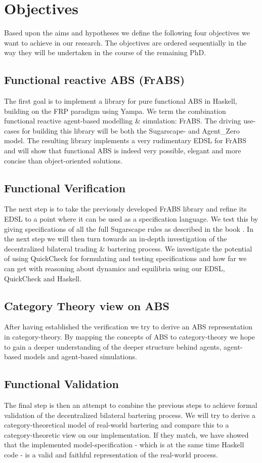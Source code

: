 \section{Objectives}
Based upon the aims and hypotheses we define the following four objectives we want to achieve in our research. The objectives are ordered sequentially in the way they will be undertaken in the course of the remaining PhD.

\subsection{Functional reactive ABS (FrABS)}
The first goal is to implement a library for pure functional ABS in Haskell, building on the FRP paradigm using Yampa. We term the combination functional reactive agent-based modelling \& simulation: FrABS. The driving use-cases for building this library will be both the Sugarscape- and Agent\_Zero model. The resulting library implements a very rudimentary EDSL for FrABS and will show that functional ABS is indeed very possible, elegant and more concise than object-oriented solutions.

\subsection{Functional Verification}
The next step is to take the previously developed FrABS library and refine its EDSL to a point where it can be used as a specification language. We test this by giving specifications of all the full Sugarscape rules as described in the book \cite{epstein_growing_1996}. In the next step we will then turn towards an in-depth investigation of the decentralized bilateral trading \& bartering process. We investigate the potential of using QuickCheck for formulating and testing specifications and how far we can get with reasoning about dynamics and equilibria using our EDSL, QuickCheck and Haskell.

\subsection{Category Theory view on ABS}
After having established the verification we try to derive an ABS representation in category-theory. By mapping the concepts of ABS to category-theory we hope to gain a deeper understanding of the deeper structure behind agents, agent-based models and agent-based simulations.

\subsection{Functional Validation}
The final step is then an attempt to combine the previous steps to achieve formal validation of the decentralized bilateral bartering process. We will try to derive a category-theoretical model of real-world bartering and compare this to a category-theoretic view on our implementation. If they match, we have showed that the implemented model-specification - which is at the same time Haskell code - is a valid and faithful representation of the real-world process.

